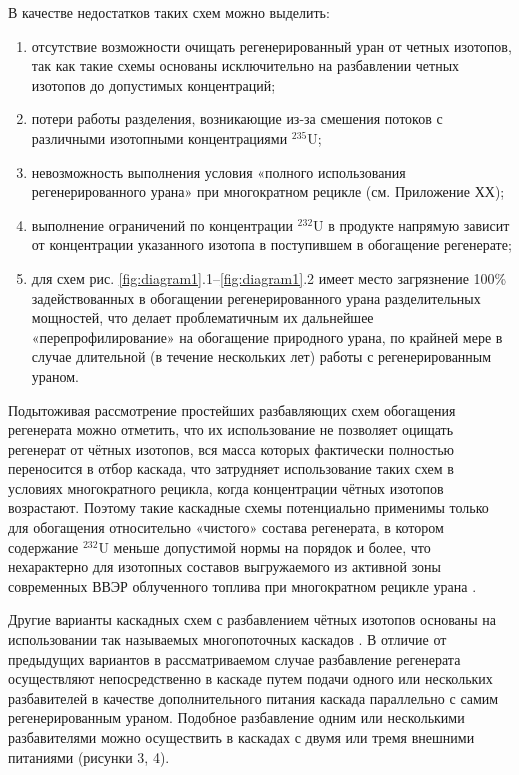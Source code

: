 В качестве недостатков таких схем можно выделить:
\begin{enumerate}
  \item отсутствие возможности очищать регенерированный уран от четных изотопов, так как такие схемы основаны исключительно на разбавлении четных изотопов до допустимых концентраций;
  \item потери работы разделения, возникающие из-за смешения потоков с различными изотопными концентрациями $^{235}$U;
  \item невозможность выполнения условия «полного использования регенерированного урана» при многократном рецикле \cite{smirnovApplyingEnrichmentCapacities2018} (см. Приложение ХХ);
  \item выполнение ограничений по концентрации $^{232}$U в продукте напрямую зависит от концентрации указанного изотопа в поступившем в обогащение регенерате;
  \item для схем рис. \ref{fig:diagram1}.1--\ref{fig:diagram1}.2 имеет место загрязнение 100\% задействованных в обогащении регенерированного урана разделительных мощностей, что делает проблематичным их дальнейшее «перепрофилирование» на обогащение природного урана, по крайней мере в случае длительной (в течение нескольких лет) работы с регенерированным ураном.
\end{enumerate}

Подытоживая рассмотрение простейших разбавляющих схем обогащения регенерата можно отметить, что их использование не позволяет оцищать регенерат от чётных изотопов, вся масса которых фактически полностью переносится в отбор каскада, что затрудняет использование таких схем в условиях многократного рецикла, когда концентрации чётных изотопов возрастают. Поэтому такие каскадные схемы потенциально применимы только для обогащения относительно «чистого» состава регенерата, в котором содержание $^{232}$U меньше допустимой нормы на порядок и более, что нехарактерно для изотопных составов выгружаемого из активной зоны современных ВВЭР облученного топлива при многократном рецикле урана \cite{bormanTehnikoekonomicheskiyAnalizVozmozhnyh2012}. 

Другие варианты каскадных схем с разбавлением чётных изотопов основаны на использовании так называемых многопоточных каскадов \cite{sulaberidzeQuasiidealCascadesAdditional2006}. В отличие от предыдущих вариантов в рассматриваемом случае разбавление регенерата осуществляют непосредственно в каскаде путем подачи одного или нескольких разбавителей в качестве дополнительного питания каскада параллельно с самим регенерированным ураном. Подобное разбавление одним или несколькими разбавителями можно осуществить в каскадах с двумя или тремя внешними питаниями (рисунки 3, 4).


